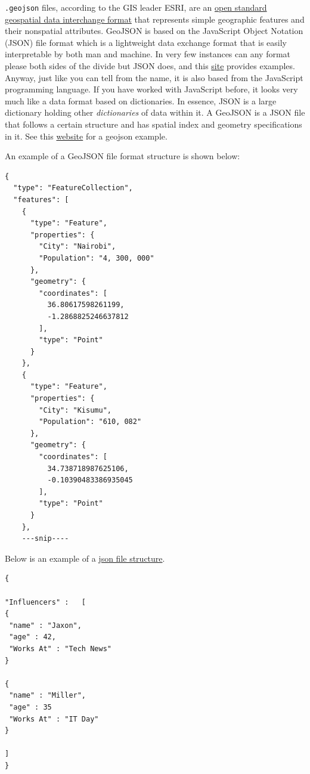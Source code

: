 \documentclass[
]{book}
\begin{document}
\texttt{.geojson} files, according to the GIS leader ESRI, are an \href{https://doc.arcgis.com/en/arcgis-online/reference/geojson.htm}{open standard geospatial data interchange format} that represents simple geographic features and their nonspatial attributes. GeoJSON is based on the JavaScript Object Notation (JSON) file format which is a lightweight data exchange format that is easily interpretable by both man and machine. In very few instances can any format please both sides of the divide but JSON does, and this \href{https://www.oracle.com/ke/database/what-is-json/}{site} provides examples. Anyway, just like you can tell from the name, it is also based from the JavaScript programming language. If you have worked with JavaScript before, it looks very much like a data format based on dictionaries. In essence, JSON is a large dictionary holding other \emph{dictionaries} of data within it. A GeoJSON is a JSON file that follows a certain structure and has spatial index and geometry specifications in it. See this \href{https://datascience.aero/geospatial-data-representation-the-geojson-format/}{website} for a geojson example.

An example of a GeoJSON file format structure is shown below:

\begin{verbatim}
{
  "type": "FeatureCollection",
  "features": [
    {
      "type": "Feature",
      "properties": {
        "City": "Nairobi",
        "Population": "4, 300, 000"
      },
      "geometry": {
        "coordinates": [
          36.80617598261199,
          -1.2868825246637812
        ],
        "type": "Point"
      }
    },
    {
      "type": "Feature",
      "properties": {
        "City": "Kisumu",
        "Population": "610, 082"
      },
      "geometry": {
        "coordinates": [
          34.738718987625106,
          -0.10390483386935045
        ],
        "type": "Point"
      }
    },
    ---snip----
\end{verbatim}

Below is an example of a \href{https://www.oracle.com/ke/database/what-is-json/}{json file structure}.

\begin{verbatim}
{

"Influencers" :   [ 
{
 "name" : "Jaxon", 
 "age" : 42, 
 "Works At" : "Tech News"
}

{
 "name" : "Miller", 
 "age" : 35
 "Works At" : "IT Day"
}

] 
}
\end{verbatim}
\end{document}

